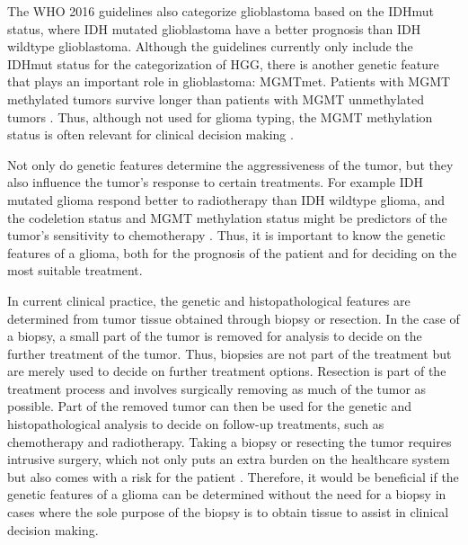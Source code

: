 The \gls{WHO} 2016 guidelines also categorize \gls{glioblastoma} based on the \gls{IDHmut} status, where \gls{IDH} mutated \gls{glioblastoma} have a better prognosis than \gls{IDH} wildtype \gls{glioblastoma}.
Although the guidelines currently only include the \gls{IDHmut} status for the categorization of \gls{HGG}, there is another genetic feature that plays an important role in \gls{glioblastoma}: \gls{MGMTmet}.
Patients with \gls{MGMT} methylated \glspl{tumor} survive longer than patients with \gls{MGMT} unmethylated \glspl{tumor} \autocite{martinez2007MGMT, gessler2018MGMT, weller2009molecularGBM}.
Thus, although not used for \gls{glioma} typing, the \gls{MGMT} methylation status is often relevant for clinical decision making \autocite{molinaro2019geneticepidemiology}.

Not only do genetic features determine the aggressiveness of the \gls{tumor}, but they also influence the \gls{tumor}'s response to certain treatments.
For example \gls{IDH} mutated \gls{glioma} respond better to radiotherapy than \gls{IDH} wildtype \gls{glioma}, and the \gls{codeletion} status and \gls{MGMT} methylation status might be predictors of the \gls{tumor}'s sensitivity to chemotherapy \autocite{juratli2015IDHtreatment, idbaih2007markersresponse}.
Thus, it is important to know the genetic features of a \gls{glioma}, both for the prognosis of the patient and for deciding on the most suitable treatment.

In current clinical practice, the genetic and histopathological features are determined from \gls{tumor} tissue obtained through biopsy or resection.
In the case of a biopsy, a small part of the \gls{tumor} is removed for analysis to decide on the further treatment of the \gls{tumor}.
Thus, biopsies are not part of the treatment but are merely used to decide on further treatment options.
Resection is part of the treatment process and involves surgically removing as much of the \gls{tumor} as possible.
Part of the removed \gls{tumor} can then be used for the genetic and histopathological analysis to decide on follow-up treatments, such as chemotherapy and radiotherapy.
Taking a biopsy or resecting the \gls{tumor} requires intrusive surgery, which not only puts an extra burden on the healthcare system but also comes with a risk for the patient \autocite{chen2009biopsy}.
Therefore, it would be beneficial if the genetic features of a \gls{glioma} can be determined without the need for a biopsy in cases where the sole purpose of the biopsy is to obtain tissue to assist in clinical decision making.

